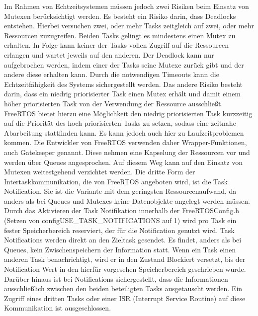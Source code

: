 Im Rahmen von Echtzeitsystemen müssen jedoch zwei Risiken beim Einsatz von Mutexen berücksichtigt werden. Es besteht ein Risiko darin, dass Deadlocks entstehen. Hierbei versuchen zwei, oder mehr Tasks zeitgleich auf zwei, oder mehr Ressourcen zuzugreifen. Beiden Tasks gelingt es mindestens einen Mutex zu erhalten. In Folge kann keiner der Tasks vollen Zugriff auf die Ressourcen erlangen und wartet jeweils auf den anderen. Der Deadlock kann nur aufgebrochen werden, indem einer der Tasks seine Mutexe zurück gibt und der andere diese erhalten kann. 
Durch die notwendigen Timeouts kann die Echt\-zeit\-fähig\-keit des Systems sichergestellt werden. Das andere Risiko besteht darin, dass ein niedrig priorisierter Task einen Mutex erhält und damit einem höher priorisierten Task von der Verwendung der Ressource ausschließt. FreeRTOS bietet hierzu eine Möglichkeit den niedrig priorisierten Task kurzzeitig auf die Priorität des hoch priorisierten Tasks zu setzen, sodass eine zeitnahe Abarbeitung stattfinden kann. Es kann jedoch auch hier zu Laufzeitproblemen kommen. 
Die Entwickler von FreeRTOS verwenden daher Wrapper-Funktionen, auch Gatekeeper genannt. Diese nehmen eine Kapselung der Ressourcen vor und werden über Queues angesprochen. Auf diesem Weg kann auf den Einsatz von Mutexen weitestgehend verzichtet werden.
Die dritte Form der Intertaskkommunikation, die von FreeRTOS angeboten wird, ist die Task Notification. Sie ist die Variante mit dem geringsten Ressourcenaufwand, da anders als bei Queues und Mutexes keine Datenobjekte angelegt werden müssen. Durch das Aktivieren der Task Notifikation innerhalb der FreeRTOSConfig.h (Setzen von configUSE\_TASK\_NOTIFICATIONS auf 1) wird pro Task ein fester Speicherbereich reserviert, der für die Notification genutzt wird. Task Notifications werden direkt an den Zieltask gesendet. Es findet, anders als bei Queues, kein Zwischenspeichern der Information statt. Wenn ein Task einen anderen Task benachrichtigt, wird er in den Zustand Blockiert versetzt, bis der Notification Wert in den hierfür vorgesehen Speicherbereich geschrieben wurde. Darüber hinaus ist bei Notifications sichergestellt, dass die Informationen ausschließlich zwischen den beiden beteiligten Tasks ausgetauscht werden. Ein Zugriff eines dritten Tasks oder einer ISR (Interrupt Service Routine) auf diese Kommunikation ist ausgeschlossen.
